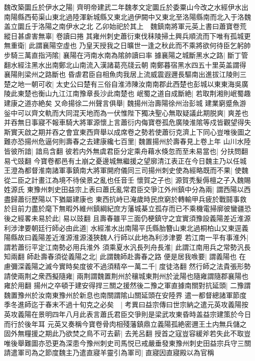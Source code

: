 魏改築圜丘於伊水之陽|{
	齊明帝建武二年魏孝文定圜丘於委粟山今改之水經伊水出南陽縣西荀渠山東北過陸渾新城縣又東北過伊闕中又東北至洛陽縣南而北入于洛魏盖立圜丘于洛陽之南伊水之北}
乙卯始祀於其上　魏鎮南將軍元英上書曰蕭寶卷荒縱日甚虐害無辜|{
	卷讀曰捲}
其雍州刺史蕭衍東伐秣陵掃土興兵順流而下唯有孤城更無重衛|{
	此謂襄陽空虛也}
乃皇天授我之日曠世一逢之秋此而不乘將欲何待臣乞躬帥步騎三萬直指沔隂|{
	襄陽在沔南水南為隂帥讀曰率}
據襄陽之城斷黑水之路|{
	斷丁管翻水經注黑水出南鄭北山南流入漢諸葛亮牋云朝南鄭暮宿黑水四五十里英盖謂得襄陽則梁州之路斷也}
昏虐君臣自相魚肉我居上流威震遐邇長驅南出進拔江陵則三楚之地一朝可收|{
	太史公曰楚有三俗自淮沛陳汝南南郡此西楚也彭城以東東海吳廣陵此東楚也衡山九江江南豫章長沙此南楚也}
岷蜀之道自成斷絶|{
	若取荆湘則岷蜀趣建康之道亦絶矣}
又命揚徐二州聲言俱舉|{
	魏揚州治壽陽徐州治彭城}
建業窮蹙魚游釡中可以齊文軌而大同混天地而為一伏惟陛下獨决聖心無取疑議此期脱爽|{
	爽差也}
并吞無日事寢不報車騎大將軍源懷上言蕭衍内侮寶卷孤危廣陵淮隂等戍皆觀望得失斯實天啟之期并吞之會宜東西齊舉以成席卷之勢若使蕭衍克濟上下同心豈唯後圖之難亦恐揚州危逼何則壽春之去建康纔七百里|{
	魏置揚州於壽春見上卷上年}
山川水陸皆彼所諳|{
	諳烏含翻}
彼若内外無虞君臣分定乘舟藉水倏忽而至未易當也|{
	分扶問翻易弋豉翻}
今寶卷都邑有土崩之憂邊城無繼援之望廓清江表正在今日魏主乃以任城王澄為都督淮南諸軍事鎮南大將軍開府儀同三司揚州刺史使為經略既而不果|{
	使魏從二臣之計畫江為境不待侯景之亂也任音壬}
懷賀之子也|{
	源賀秃髮傉檀之子入魏賜姓源氏}
東豫州刺史田益宗上表曰蕭氏亂常君臣交爭江外州鎮中分為兩|{
	謂西陽以西盡歸蕭衍歷陽以下猶屬建康也}
東西抗峙已淹歲時民庶窮於轉輸甲兵疲於戰鬪事救於目前力盡於麾下無暇外維州鎮綱紀庶方藩城棊立孤存而已不乘機電掃廓彼蠻疆恐後之經畧未易於此|{
	易以豉翻}
且壽春雖平三面仍梗鎮守之宜實須豫設義陽差近淮源利涉津要朝廷行師必由此道|{
	水經淮水出南陽平氏縣胎簪山東北過桐柏山又東逕義陽縣故曰義陽差近淮源淮源淺狹魏人行師以此地為利涉津要}
若江南一平有事淮外|{
	謂若蕭衍平定江南勢必用兵淮外}
須乘夏水汎長列舟長淮|{
	此謂江南用兵之常勢汎長知兩翻}
師赴壽春須從義陽之北|{
	此謂魏師赴壽春之路}
便是居我㗋要|{
	謂義陽也}
在慮彌深義陽之滅今實時矣度彼不過須精卒一萬二千|{
	度徒洛翻}
然行師之法貴張形勢請使兩荆之衆西擬隨雍|{
	兩荆謂魏置荆州於穰城東荆州於泚陽也隨雍謂隨郡襄陽也雍於用翻}
揚州之卒頓于建安得捍三關之援然後二豫之軍直據南關對抗延頭|{
	二豫謂魏置豫州於汝南東豫州於新息也南關謂隂山關延頭在安陸界}
遣一都督總諸軍節度季冬進師迄于春末不過十旬克之必矣　|{
	考異曰益宗傳曰世宗納之遣元英攻義陽按英攻義陽在景明四年八月此表言蕭氏君臣交爭則是梁武攻東昏時盖益宗建策於今日而行於後年耳}
元英又奏稱今寶卷骨肉相殘藩鎮鼎立義陽孤絶密邇王土内無兵儲之固外無糧援之期此乃欲焚之鳥不可去薪|{
	去羌呂翻}
授首之寇豈容緩斧若失此不取豈唯後舉難圖亦恐更為深患今豫州刺史司馬悦已戒嚴垂發東豫州刺史田益宗兵守三關請遣軍司為之節度魏主乃遣直寢羊靈引為軍司|{
	直寢因直寢殿以為官稱}
